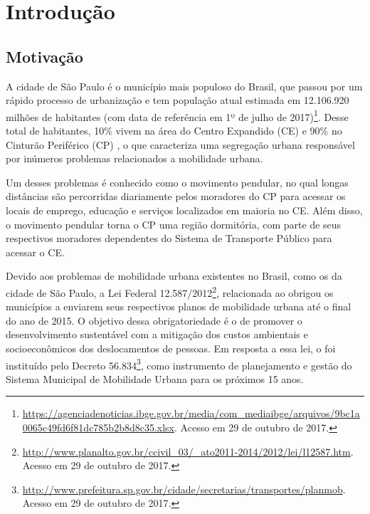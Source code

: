 \documentclass[
	12pt,				%
	oneside,			%
	a4paper,			%
	english,			%
	brazil				%
	]{abntex2ppgsi}
\begin{document}
\chapter{Introdução}
\label{introducao}


\section{Motivação}
\label{motivation}

A cidade de São Paulo é o município mais populoso do Brasil, que passou por um rápido processo de urbanização e tem população atual estimada em 12.106.920 milhões de habitantes (com data de referência em 1º de julho de 2017)\footnote{\url{https://agenciadenoticias.ibge.gov.br/media/com\_mediaibge/arquivos/9bc1a0065c49fd6f81dc785b2b8d8c35.xlsx}. Acesso em 29 de outubro de 2017.}.
Desse total de habitantes, 10\% vivem na área do 
{Centro Expandido (CE)} e 90\% no 
{Cinturão Periférico (CP)}  \cite{SA201722}, o que caracteriza uma segregação urbana responsável por inúmeros problemas relacionados a mobilidade urbana.

Um desses problemas é conhecido como o movimento pendular, no qual longas distâncias são percorridas diariamente pelos moradores do CP para acessar os locais de emprego, educação e serviços localizados em maioria no CE. Além disso, o movimento pendular torna o CP  uma região dormitória, com parte de seus respectivos moradores dependentes do Sistema de Transporte Público para acessar o CE.

Devido aos problemas de mobilidade urbana existentes no Brasil, como os da cidade de São Paulo, a Lei Federal 12.587/2012\footnote{\url{http://www.planalto.gov.br/ccivil\_03/\_ato2011-2014/2012/lei/l12587.htm}. Acesso em 29 de outubro de 2017.}, relacionada ao  obrigou os municípios a enviarem seus respectivos planos de mobilidade urbana até o final do ano de 2015.  O objetivo dessa obrigatoriedade é o de promover o desenvolvimento sustentável com a mitigação dos custos ambientais e socioeconômicos dos deslocamentos de pessoas. Em resposta a essa lei, o  foi instituído pelo Decreto 56.834\footnote{\label{planmob}\url{http://www.prefeitura.sp.gov.br/cidade/secretarias/transportes/planmob}. Acesso em 29 de outubro de 2017.}, como instrumento de planejamento e gestão do Sistema Municipal de Mobilidade Urbana para os próximos 15 anos.
\end{document}
